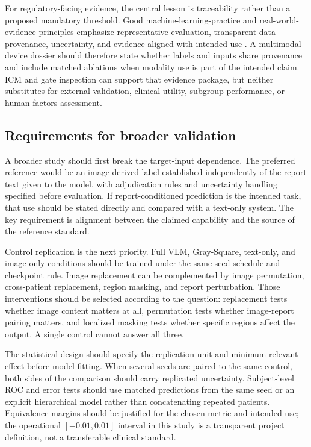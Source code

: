 \documentclass[10pt,a4paper,twocolumn]{article}
\begin{document}
For regulatory-facing evidence, the central lesson is traceability rather than
a proposed mandatory threshold. Good machine-learning-practice and real-world-
evidence principles emphasize representative evaluation, transparent data
provenance, uncertainty, and evidence aligned with intended use
\cite{fda2025gmlp,fda2025rwe}. A multimodal device dossier should therefore
state whether labels and inputs share provenance and include matched ablations
when modality use is part of the intended claim. ICM and gate inspection can
support that evidence package, but neither substitutes for external validation,
clinical utility, subgroup performance, or human-factors assessment.

\subsection{Requirements for broader validation}\label{sec:validation-design}

A broader study should first break the target-input dependence. The preferred
reference would be an image-derived label established independently of the
report text given to the model, with adjudication rules and uncertainty handling
specified before evaluation. If report-conditioned prediction is the intended
task, that use should be stated directly and compared with a text-only system.
The key requirement is alignment between the claimed capability and the source
of the reference standard.

Control replication is the next priority. Full VLM, Gray-Square, text-only, and
image-only conditions should be trained under the same seed schedule and
checkpoint rule. Image replacement can be complemented by image permutation,
cross-patient replacement, region masking, and report perturbation. Those
interventions should be selected according to the question: replacement tests
whether image content matters at all, permutation tests whether image-report
pairing matters, and localized masking tests whether specific regions affect
the output. A single control cannot answer all three.

The statistical design should specify the replication unit and minimum relevant
effect before model fitting. When several seeds are paired to the same control,
both sides of the comparison should carry replicated uncertainty. Subject-level
ROC and error tests should use matched predictions from the same seed or an
explicit hierarchical model rather than concatenating repeated patients.
Equivalence margins should be justified for the chosen metric and intended use;
the operational $[-0.01,0.01]$ interval in this study is a transparent project
definition, not a transferable clinical standard.
\end{document}

